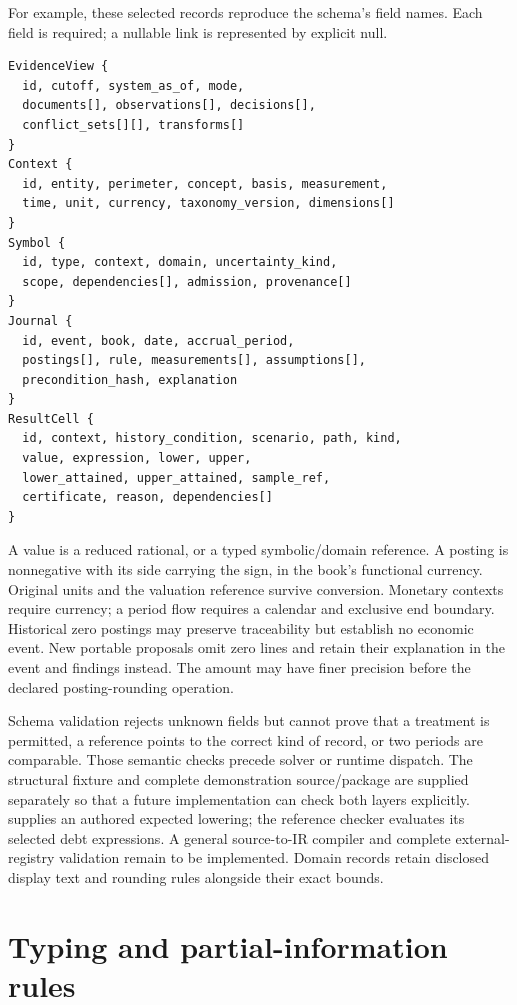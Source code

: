 \begin{minipage}{\linewidth}
For example, these selected records reproduce the schema's field names.
Each field is required; a nullable link is represented by explicit null.

\begin{lstlisting}
EvidenceView {
  id, cutoff, system_as_of, mode,
  documents[], observations[], decisions[],
  conflict_sets[][], transforms[]
}
Context {
  id, entity, perimeter, concept, basis, measurement,
  time, unit, currency, taxonomy_version, dimensions[]
}
Symbol {
  id, type, context, domain, uncertainty_kind,
  scope, dependencies[], admission, provenance[]
}
Journal {
  id, event, book, date, accrual_period,
  postings[], rule, measurements[], assumptions[],
  precondition_hash, explanation
}
ResultCell {
  id, context, history_condition, scenario, path, kind,
  value, expression, lower, upper,
  lower_attained, upper_attained, sample_ref,
  certificate, reason, dependencies[]
}
\end{lstlisting}
\end{minipage}

A value is a reduced rational, or a typed symbolic/domain reference. A
posting is nonnegative with its side carrying the sign, in the book's
functional currency. Original units and the valuation reference survive
conversion. Monetary contexts require currency; a period flow requires a
calendar and exclusive end boundary. Historical zero postings may preserve traceability but establish no economic
event. New portable proposals omit zero lines and retain their explanation in
the event and findings instead. The amount may have
finer precision before the declared posting-rounding operation.

Schema validation rejects unknown fields but cannot prove that a treatment
is permitted, a reference points to the correct kind of record, or two periods
are comparable. Those semantic checks precede solver or runtime dispatch.
The structural fixture and complete demonstration source/package are supplied
separately so that a future implementation can check both layers explicitly.
 supplies an authored expected lowering;
the reference checker evaluates its selected debt expressions. A general
source-to-IR compiler and complete external-registry validation remain to be
implemented. Domain records retain disclosed display text and rounding rules
alongside their exact bounds.

\section{Typing and partial-information rules}

